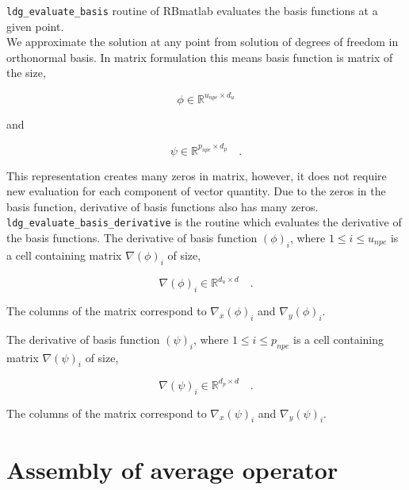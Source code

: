 \documentclass[a4paper]{book}
\begin{document}
\verb|ldg_evaluate_basis| routine of RBmatlab evaluates the basis functions at a given point.\\

We approximate the solution at any point from solution of degrees of freedom in orthonormal basis. In matrix formulation this means basis function is matrix of the size,

\begin{equation}\label{basis_func_velocity_rbmatlab}
\phi \in \mathbb{R}^{u_{npe} \times d_u}
\end{equation}

and

\begin{equation}\label{basis_func_pressure_rbmatlab}
\psi \in \mathbb{R}^{p_{npe} \times d_p} \quad \textrm{.}
\end{equation}

This representation creates many zeros in matrix, however, it does not require new evaluation for each component of vector quantity. Due to the zeros in the basis function, derivative of basis functions also has many zeros.\\

\verb|ldg_evaluate_basis_derivative| is the routine which evaluates the derivative of the basis functions. The derivative of basis function $(\phi)_{i}$, where $1 \leq i \leq u_{npe}$ is a cell containing matrix $\nabla (\phi)_{i}$ of size,

\begin{equation}\label{basis_func_derivative_velocity_rbmatlab}
\nabla (\phi)_{i} \in \mathbb{R}^{{d_u} \times d} \quad \textrm{.}
\end{equation}

The columns of the matrix correspond to $\nabla_x (\phi)_{i}$ and $\nabla_y (\phi)_{i}$.

The derivative of basis function $(\psi)_{i}$, where $1 \leq i \leq p_{npe}$ is a cell containing matrix $\nabla (\psi)_{i}$ of size,

\begin{equation}\label{basis_func_derivative_pressure_rbmatlab}
\nabla (\psi)_{i} \in \mathbb{R}^{{d_p} \times d} \quad \textrm{.}
\end{equation}

The columns of the matrix correspond to $\nabla_x (\psi)_{i}$ and $\nabla_y (\psi)_{i}$.

\section{Assembly of average operator}
\end{document}
